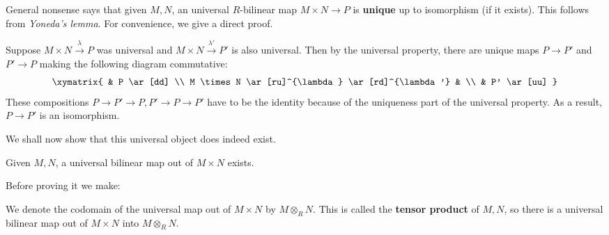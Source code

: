 General nonsense says that given $M,N$, an universal $R$-bilinear map $M
\times N \to P$ is
\textbf{unique} up to isomorphism (if it exists). This  follows from \emph{Yoneda's lemma}.
For convenience, we give a direct proof.

Suppose $M \times N \stackrel{\lambda}{\to} P$ was universal and $M \times N
\stackrel{\lambda'}{\to} P'$ is also
universal. Then by the universal property, there are unique maps $P \to P'$
and $P' \to P$ making the
following diagram commutative:
\[
\xymatrix{
& P \ar[dd] \\
M \times N \ar[ru]^{\lambda} \ar[rd]^{\lambda'} & \\
& P' \ar[uu]
}
\]
These compositions $P \to P' \to P, P' \to P \to P'$ have to be the identity
because of the uniqueness part of the universal property.
As a result, $P \to P'$ is an isomorphism.

We shall now show that this universal object does indeed exist.

\begin{proposition} \label{tensorexists}
Given $M,N$, a universal bilinear map out of $M \times N$ exists.
\end{proposition}

Before proving it we make:
\begin{definition}
We denote the codomain of the universal map out of $M \times N $ by $M
\otimes_R N$. This is called the \textbf{tensor product} of $M,N$, so there
is a universal bilinear map out of $M \times N$ into $M \otimes_R N$.
\end{definition}

